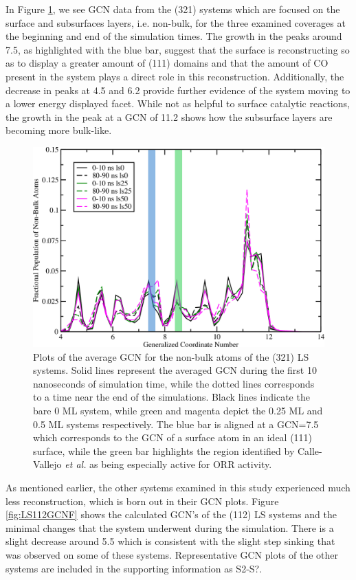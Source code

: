 In Figure \ref{fig:LS321GCNF}, we see GCN data from the  (321) systems
which are focused on the surface and subsurfaces layers, i.e. non-bulk, for the
three examined coverages at  the beginning and end of the simulation times. The
growth in the peaks around 7.5, as highlighted with the blue bar, suggest that
the surface is reconstructing so as to display a greater amount of (111)
domains and that the amount of CO present in the system plays a direct role in
this reconstruction. Additionally, the decrease in peaks at 4.5 and 6.2 provide
further evidence of the system moving to a lower energy displayed facet. While
not as helpful to surface catalytic reactions, the growth in the peak at a GCN
of 11.2 shows how the subsurface layers are becoming more bulk-like.

\begin{figure}
  \includegraphics[width=\linewidth]{../figures/chap4/321ls_GCNF.pdf}
  \caption{Plots of the average GCN for the non-bulk atoms of the  (321)
LS systems.  Solid lines represent the averaged GCN during the first 10
nanoseconds of simulation time, while the dotted lines corresponds to a time near
the end of the simulations. Black lines indicate the bare 0 ML system, while
green and magenta depict the 0.25 ML and 0.5 ML systems respectively. The blue
bar is aligned at a GCN=7.5 which corresponds to the GCN of a surface atom in
an ideal  (111) surface, while the green bar highlights the region
identified by Calle-Vallejo {\em et al.} as being especially active for ORR
activity.\citep{Calle-Vallejo:2015qq}}
\label{fig:LS321GCNF}
\end{figure}

As mentioned earlier, the other systems examined in this study experienced much
less reconstruction, which is born out in their GCN plots. Figure
\ref{fig:LS112GCNF} shows the calculated GCN's of the  (112) LS
systems and the minimal changes that the system underwent during the
simulation. There is a slight decrease around 5.5 which is consistent with the
slight step sinking that was observed on some of these systems. Representative GCN plots
of the other systems are included in the supporting information as S2-S?.

